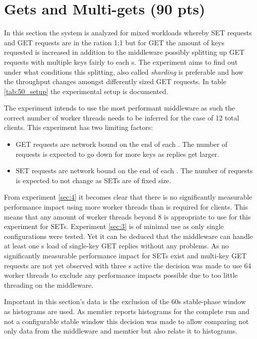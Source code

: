 \section{Gets and Multi-gets (90 pts)\label{sec:5}}

    In this section the system is analyzed for mixed workloads whereby SET requests and GET requests are in the ration
    1:1 but for GET the amount of keys requested is increased in addition to the middleware possibly splitting up GET
    requests with multiple keys fairly to each \srv{}s. The experiment aims to find out under what conditions this
    splitting, also called \emph{sharding} is preferable and how the throughput changes amongst differently sized GET
    requests. In table \ref{tab:50_setup} the experimental setup is documented.

    The experiment intends to use the most performant middleware as such the correct number of worker threads needs to
    be inferred for the case of 12 total clients. This experiment has two limiting factors:
    \begin{itemize}
        \item GET requests are network bound on the end of each \srv{}. The number of requests is expected to go down
              for more keys as replies get larger.
        \item SET requests are network bound on the end of each \cli{}. The number of requests is expected to not change
              as SETs are of fixed size.
    \end{itemize}
    From experiment \ref{sec:4} it becomes clear that there is no significantly measurable performance impact using more
    worker threads than is required for clients. This means that any amount of worker threads beyond 8 is appropriate to
    use for this experiment for SETs. Experiment \ref{sec:3} is of minimal use as only single \srv{} configurations were
    tested. Yet it can be deduced that the middleware can handle at least one \srv{}s load of single-key GET replies
    without any problems. As no significantly measurable performance impact for SETs exist and multi-key GET requests
    are not yet observed with three \srv{}s active the decision was made to use 64 worker threads to exclude any
    performance impacts possible due to too little threading on the middleware.

    Important in this section's data is the exclusion of the 60s stable-phase window as histograms are used. As memtier
    reports histograms for the complete run and not a configurable stable window this decision was made to allow
    comparing not only data from the middleware and memtier but also relate it to histograms.

